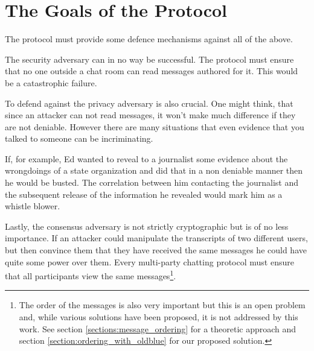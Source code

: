 \section{The Goals of the Protocol}

The protocol must provide some defence mechanisms against all of the above.

The security adversary \secadv can in no way be successful.
The protocol must ensure that no one outside a chat room can read messages authored for it.
This would be a catastrophic failure.

To defend against the privacy adversary \privadv is also crucial.
One might think, that since an attacker can not read messages, it won't make much difference if they are not deniable.
However there are many situations that even evidence that you talked to someone can be incriminating.

If, for example, Ed wanted to reveal to a journalist some evidence about the wrongdoings of a state organization and did that in a non deniable manner then he would be busted.
The correlation between him contacting the journalist and the subsequent release of the information he revealed would mark him as a whistle blower.

Lastly, the consensus adversary \conadv is not strictly cryptographic but is of no less importance.
If an attacker could manipulate the transcripts of two different users, but then convince them that they have received the same messages he could have quite some power over them.
Every multi-party chatting protocol must ensure that all participants view the same messages\footnote{The order of the messages is also very important but this is an open problem and, while various solutions have been proposed, it is not addressed by this work. See section \ref{sections:message_ordering} for a theoretic approach and section \ref{section:ordering_with_oldblue} for our proposed solution.}.
